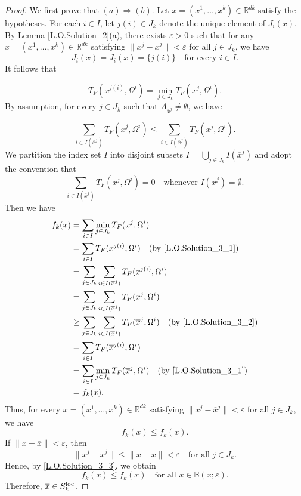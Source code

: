 \documentclass[sn-mathphys-num]{sn-jnl}%
\theoremstyle{definition}
\begin{document}
\begin{proof} We first prove that $(a) \Rightarrow (b)$. Let $\overline{x}=(\overline{x}^1,\dots,\overline{x}^k)\in \mathbb{R}^{dk}$ satisfy the hypotheses. For each $i \in I$, let $j(i)\in J_k$ denote the unique element of $J_i(\overline{x})$. By Lemma \ref{L.O.Solution_2}(a), there exists $\varepsilon>0$ such that for any $x=(x^1,\dots,x^k)\in \mathbb{R}^{dk}$ satisfying $\|x^j-\overline{x}^j\|<\varepsilon$ for all $j \in J_k$, we have $$J_i(x)=J_i(\overline{x})=\{j(i)\}\quad\text{for every }i \in I.$$ It follows that
	
	\begin{equation}
		\label{L.O.Solution_3_1}T_F(x^{j(i)},\Omega^i)=\min_{j \in J_k}T_F(x^j,\Omega^i).
	\end{equation}
	By assumption, for every $j \in J_k$ such that $A_{\overline{x}^j} \neq \emptyset$, we have
	
	\begin{equation}
		\label{L.O.Solution_3_2}
		\sum_{i\in I(\overline{x}^j)}T_F(\overline{x}^j,\Omega^i)\leq\sum_{i\in I(\overline{x}^j)}T_F(x^j,\Omega^i).
	\end{equation}
	We partition the index set $I$ into disjoint subsets $I = \bigcup_{j \in J_k} I(\overline{x}^j)$ and adopt the convention that$$\sum_{i \in I(\overline{x}^j)} T_F(x^j, \Omega^i) = 0 \quad \text{whenever } I(\overline{x}^j) = \emptyset.$$
	Then we have
	\[
	\begin{aligned}
		f_k(x) 
		&= \sum_{i \in I} \min_{j \in J_k} T_F(x^j,\Omega^i) \\
		&= \sum_{i \in I} T_F(x^{j(i)},\Omega^i) \quad (\text{by \eqref{L.O.Solution_3_1}})\\ 
		&= \sum_{j \in J_k} \sum_{i \in I(\overline{x}^j)} T_F(x^{j(i)},\Omega^i) \\
		&= \sum_{j \in J_k} \sum_{i \in I(\overline{x}^j)} T_F(x^j,\Omega^i) \\
		&\geq \sum_{j \in J_k} \sum_{i \in I(\overline{x}^j)} T_F(\overline{x}^{j},\Omega^i) \quad (\text{by \eqref{L.O.Solution_3_2}})\\
		&= \sum_{i \in I} T_F(\overline{x}^{j(i)},\Omega^i) \\
		&= \sum_{i \in I} \min_{j\in J_k}T_F(\overline{x}^j,\Omega^i) \quad (\text{by \eqref{L.O.Solution_3_1}})\\
		&= f_k(\overline{x}).
	\end{aligned}
	\]
	Thus, for every $x=(x^1,\dots,x^k) \in \mathbb{R}^{dk}$ satisfying $\|x^j-\overline{x}^j \|<\varepsilon$ for all $j \in J_k$, we have
	\begin{equation}
		\label{L.O.Solution_3_3}
		f_k(\overline{x}) \leq f_k(x).
	\end{equation}
	If $\|x-\overline{x}\|<\varepsilon$, then
	\[
	\|x^j-\overline{x}^j\|\le \|x-\overline{x}\|<\varepsilon
	\quad \text{for all } j \in J_k.
	\]
	Hence, by \eqref{L.O.Solution_3_3}, we obtain
	\[
	f_k(\overline{x})\le f_k(x)
	\quad \text{for all } x\in\mathbb{B}(\overline{x};\varepsilon).
	\]
	Therefore, $\overline{x}\in S_k^{{\rm loc}}$.
	

\end{proof}
\end{document}
